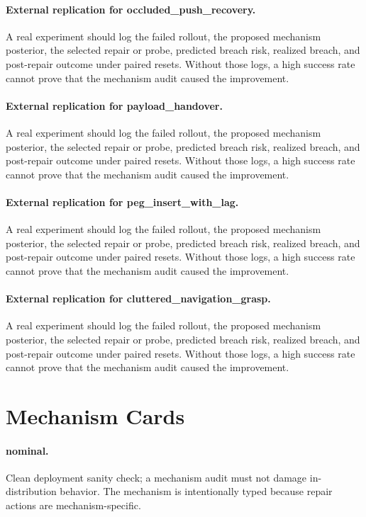 \documentclass{article}
\begin{document}
\paragraph{External replication for occluded\_push\_recovery.} A real experiment should log the failed rollout, the proposed mechanism posterior, the selected repair or probe, predicted breach risk, realized breach, and post-repair outcome under paired resets. Without those logs, a high success rate cannot prove that the mechanism audit caused the improvement.
\paragraph{External replication for payload\_handover.} A real experiment should log the failed rollout, the proposed mechanism posterior, the selected repair or probe, predicted breach risk, realized breach, and post-repair outcome under paired resets. Without those logs, a high success rate cannot prove that the mechanism audit caused the improvement.
\paragraph{External replication for peg\_insert\_with\_lag.} A real experiment should log the failed rollout, the proposed mechanism posterior, the selected repair or probe, predicted breach risk, realized breach, and post-repair outcome under paired resets. Without those logs, a high success rate cannot prove that the mechanism audit caused the improvement.
\paragraph{External replication for cluttered\_navigation\_grasp.} A real experiment should log the failed rollout, the proposed mechanism posterior, the selected repair or probe, predicted breach risk, realized breach, and post-repair outcome under paired resets. Without those logs, a high success rate cannot prove that the mechanism audit caused the improvement.
\clearpage
\section{Mechanism Cards}
\paragraph{nominal.} Clean deployment sanity check; a mechanism audit must not damage in-distribution behavior. The mechanism is intentionally typed because repair actions are mechanism-specific.
\end{document}

